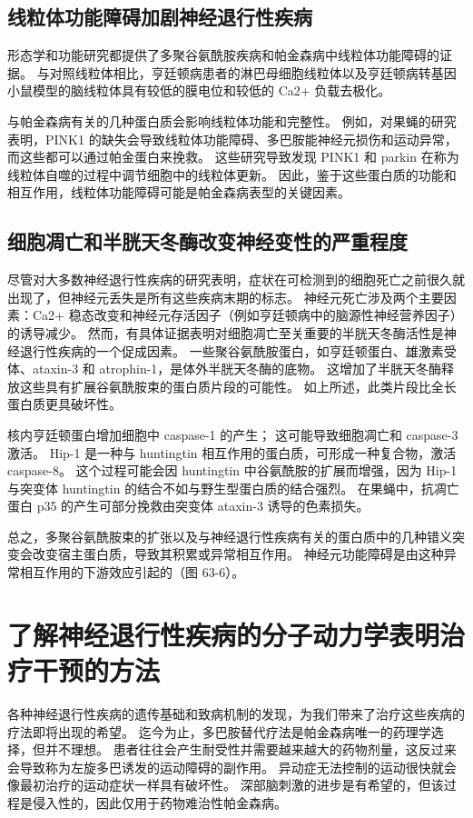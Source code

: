 \subsection{线粒体功能障碍加剧神经退行性疾病}
形态学和功能研究都提供了多聚谷氨酰胺疾病和帕金森病中线粒体功能障碍的证据。 与对照线粒体相比，亨廷顿病患者的淋巴母细胞线粒体以及亨廷顿病转基因小鼠模型的脑线粒体具有较低的膜电位和较低的 Ca2+ 负载去极化。

与帕金森病有关的几种蛋白质会影响线粒体功能和完整性。 例如，对果蝇的研究表明，PINK1 的缺失会导致线粒体功能障碍、多巴胺能神经元损伤和运动异常，而这些都可以通过帕金蛋白来挽救。 这些研究导致发现 PINK1 和 parkin 在称为线粒体自噬的过程中调节细胞中的线粒体更新。 因此，鉴于这些蛋白质的功能和相互作用，线粒体功能障碍可能是帕金森病表型的关键因素。

\subsection{细胞凋亡和半胱天冬酶改变神经变性的严重程度}

尽管对大多数神经退行性疾病的研究表明，症状在可检测到的细胞死亡之前很久就出现了，但神经元丢失是所有这些疾病末期的标志。 神经元死亡涉及两个主要因素：Ca2+ 稳态改变和神经元存活因子（例如亨廷顿病中的脑源性神经营养因子）的诱导减少。 然而，有具体证据表明对细胞凋亡至关重要的半胱天冬酶活性是神经退行性疾病的一个促成因素。 一些聚谷氨酰胺蛋白，如亨廷顿蛋白、雄激素受体、ataxin-3 和 atrophin-1，是体外半胱天冬酶的底物。 这增加了半胱天冬酶释放这些具有扩展谷氨酰胺束的蛋白质片段的可能性。 如上所述，此类片段比全长蛋白质更具破坏性。

核内亨廷顿蛋白增加细胞中 caspase-1 的产生； 这可能导致细胞凋亡和 caspase-3 激活。 Hip-1 是一种与 huntingtin 相互作用的蛋白质，可形成一种复合物，激活 caspase-8。 这个过程可能会因 huntingtin 中谷氨酰胺的扩展而增强，因为 Hip-1 与突变体 huntingtin 的结合不如与野生型蛋白质的结合强烈。 在果蝇中，抗凋亡蛋白 p35 的产生可部分挽救由突变体 ataxin-3 诱导的色素损失。

总之，多聚谷氨酰胺束的扩张以及与神经退行性疾病有关的蛋白质中的几种错义突变会改变宿主蛋白质，导致其积累或异常相互作用。 神经元功能障碍是由这种异常相互作用的下游效应引起的（图 63-6）。

\section{了解神经退行性疾病的分子动力学表明治疗干预的方法}

各种神经退行性疾病的遗传基础和致病机制的发现，为我们带来了治疗这些疾病的疗法即将出现的希望。 迄今为止，多巴胺替代疗法是帕金森病唯一的药理学选择，但并不理想。 患者往往会产生耐受性并需要越来越大的药物剂量，这反过来会导致称为左旋多巴诱发的运动障碍的副作用。 异动症无法控制的运动很快就会像最初治疗的运动症状一样具有破坏性。 深部脑刺激的进步是有希望的，但该过程是侵入性的，因此仅用于药物难治性帕金森病。

